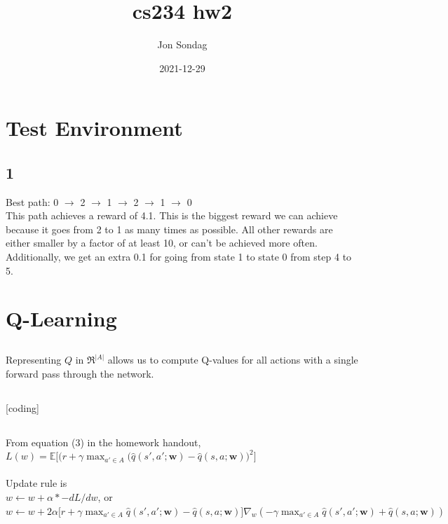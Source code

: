 \documentclass[10pt,a4paper]{article}
\title{cs234 hw2}
\date{2021-12-29}
\author{Jon Sondag}
\begin{document}
  \maketitle
  \section{Test Environment}
  \subsection{1}
Best path: 0 $\rightarrow$ 2 $\rightarrow$ 1 $\rightarrow$ 2 $\rightarrow$ 1 $\rightarrow$ 0 \\
This path achieves a reward of 4.1.
This is the biggest reward we can achieve because it goes from 2 to 1 as many times as possible.  All other rewards are either smaller by a factor of at least 10, or can't be achieved more often.  Additionally, we get an extra 0.1 for going from state 1 to state 0 from step 4 to 5.

 \section{Q-Learning}
  \subsection{}
  Representing $Q$ in $\Re^{|A|}$ allows us to compute Q-values for all actions with a single forward pass through the network.
  
  \subsection{}
  [coding]
  
  \subsection{}
  From equation (3) in the homework handout, \\
  $L(w) = \mathds{E}\Big [ \big(r + \gamma \max_{a' \in A}(\hat{q}(s',a';\boldsymbol{w}) - \hat{q}(s,a;\boldsymbol{w})\big)^2 \Big ]$ \\
  \\
  Update rule is \\
  $w \leftarrow w + \alpha * -dL/dw$, or \\
  $w \leftarrow w + 2\alpha \big[r + \gamma \max_{a' \in A} \hat{q}(s',a';\boldsymbol{w}) - \hat{q}(s,a;\boldsymbol{w})\big] \nabla_w (-\gamma \max_{a' \in A} \hat{q}(s',a';\boldsymbol{w}) + \hat{q}(s,a;\boldsymbol{w}))$ \\
  
\end{document}
